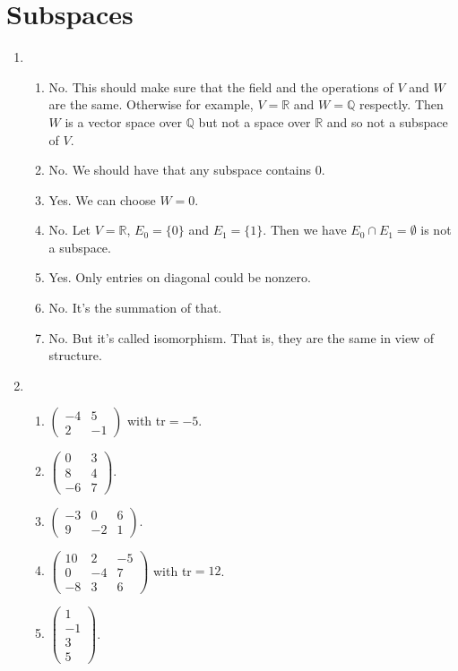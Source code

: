 \section{Subspaces}
\begin{enumerate}
\item 
\begin{enumerate}
\item No. This should make sure that the field and the operations of $V$ and $W$ are the same. Otherwise for example, $V=\mathbb{R}$ and $W=\mathbb{Q}$ respectly. Then $W$ is a vector space over $\mathbb{Q}$ but not a space over $\mathbb{R}$ and so not a subspace of $V$. 
\item No. We should have that any subspace contains $0$.
\item Yes. We can choose $W=0$.
\item No. Let $V=\mathbb{R}$, $E_0=\{0\}$ and $E_1=\{1\}$. Then we have $E_0 \cap E_1=\emptyset$ is not a subspace.
\item Yes. Only entries on diagonal could be nonzero.
\item No. It's the summation of that.
\item No. But it's called isomorphism. That is, they are the same in view of structure.
\end{enumerate}
\item 
\begin{enumerate}
\item $\left(\begin{array}{cc}-4&5\\2&-1\end{array}\right)$ with tr$=-5$.
\item $\left(\begin{array}{cc}0&3\\8&4\\-6&7\end{array}\right)$.
\item $\left(\begin{array}{ccc}-3&0&6\\9&-2&1\end{array}\right)$.
\item $\left(\begin{array}{ccc}10&2&-5\\0&-4&7\\-8&3&6\end{array}\right)$ with tr$=12$.
\item $\left(\begin{array}{c}1\\-1\\3\\5\end{array}\right)$.

\end{enumerate}
\end{enumerate}
